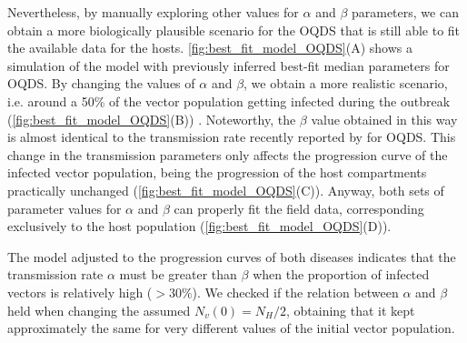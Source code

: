 Nevertheless, by manually exploring other values for $\alpha$ and $\beta$
parameters, we can obtain a more biologically plausible scenario for the OQDS
that is still able to fit the available data for the hosts.
\cref{fig:best_fit_model_OQDS}(A) shows a simulation of the model with
previously inferred best-fit median parameters for OQDS. By changing the values
of $\alpha$ and $\beta$, we obtain a more realistic scenario, i.e. around a
50\% of the vector population getting infected during the outbreak
(\cref{fig:best_fit_model_OQDS}(B)) \cite{Cavalieri2019,
    cornara2017transmission}. Noteworthy, the $\beta$ value obtained in this
way
is almost identical to the transmission rate recently reported by
\cite{Bodino2021} for OQDS. This change in the transmission parameters only
affects the progression curve of the infected vector population, being the
progression of the host compartments practically unchanged
(\cref{fig:best_fit_model_OQDS}(C)). Anyway, both sets of parameter values for
$\alpha$ and $\beta$ can properly fit the field data, corresponding exclusively
to the	host population (\cref{fig:best_fit_model_OQDS}(D)).

The model adjusted to the progression curves of both diseases indicates
that the transmission rate $\alpha$ must be greater than $\beta$ when the
proportion of infected vectors is relatively high ($>30\%$). We checked if the
relation between $\alpha$ and $\beta$ held when changing the assumed
$N_v(0)=N_H/2$, obtaining that it kept approximately the same for very
different values of the initial vector population.


